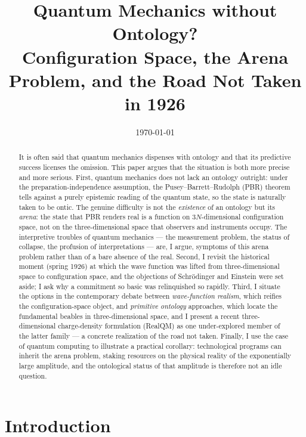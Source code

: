 \documentclass[11pt]{article}
\title{Quantum Mechanics without Ontology?\\
\large Configuration Space, the Arena Problem, and the Road Not Taken in 1926}
\author{}
\date{\today}
\begin{document}
\maketitle

\begin{abstract}
It is often said that quantum mechanics dispenses with ontology and that its predictive success licenses the
omission. This paper argues that the situation is both more precise and more serious. First, quantum mechanics
does not lack an ontology outright: under the preparation-independence assumption, the Pusey--Barrett--Rudolph
(PBR) theorem tells against a purely epistemic reading of the quantum state, so the state is naturally taken to
be ontic. The genuine difficulty is not the \emph{existence} of an ontology but its \emph{arena}: the state that
PBR renders real is a function on $3N$-dimensional configuration space, not on the three-dimensional space that
observers and instruments occupy. The interpretive troubles of quantum mechanics --- the measurement problem,
the status of collapse, the profusion of interpretations --- are, I argue, symptoms of this arena problem rather
than of a bare absence of the real. Second, I revisit the historical moment (spring 1926) at which the wave
function was lifted from three-dimensional space to configuration space, and the objections of Schr\"odinger and
Einstein were set aside; I ask why a commitment so basic was relinquished so rapidly. Third, I situate the
options in the contemporary debate between \emph{wave-function realism}, which reifies the configuration-space
object, and \emph{primitive ontology} approaches, which locate the fundamental beables in three-dimensional
space, and I present a recent three-dimensional charge-density formulation (RealQM) as one under-explored member
of the latter family --- a concrete realization of the road not taken. Finally, I use the case of quantum
computing to illustrate a practical corollary: technological programs can inherit the arena problem, staking
resources on the physical reality of the exponentially large amplitude, and the ontological status of that
amplitude is therefore not an idle question.
\end{abstract}


\section{Introduction}\label{sec:intro}
\end{document}
